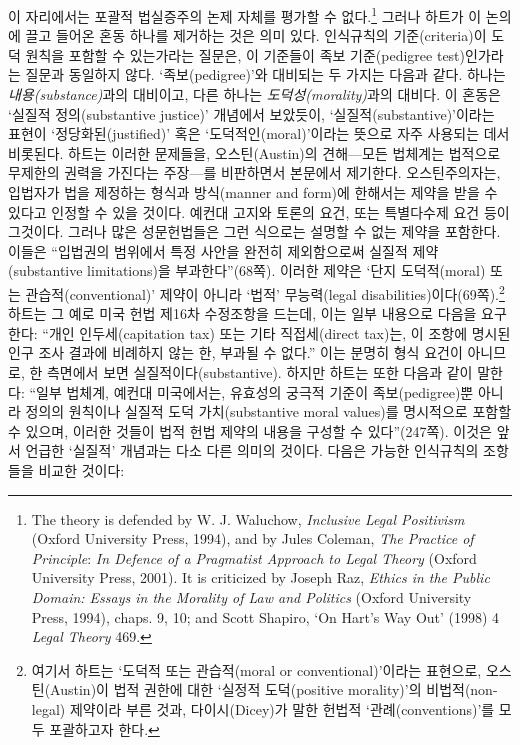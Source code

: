 \documentclass[12pt, oneside]{book}  %
\begin{document}
이 자리에서는 포괄적 법실증주의 논제 자체를 평가할 수 없다.\footnote{The
  theory is defended by W. J. Waluchow, \emph{Inclusive Legal
  Positivism} (Oxford University Press, 1994), and by Jules Coleman,
  \emph{The Practice of Principle}: \emph{In Defence of a Pragmatist
  Approach to Legal Theory} (Oxford University Press, 2001). It is
  criticized by Joseph Raz, \emph{Ethics in the Public Domain: Essays in
  the Morality of Law and Politics} (Oxford University Press, 1994),
  chaps. 9, 10; and Scott Shapiro, `On Hart's Way Out' (1998) 4
  \emph{Legal Theory} 469.} 그러나 하트가 이 논의에 끌고 들어온 혼동
하나를 제거하는 것은 의미 있다. 인식규칙의 기준(criteria)이 도덕 원칙을
포함할 수 있는가라는 질문은, 이 기준들이 족보 기준(pedigree
test)인가라는 질문과 동일하지 않다. `족보(pedigree)'와 대비되는 두
가지는 다음과 같다. 하나는 \emph{내용(substance)}과의 대비이고, 다른
하나는 \emph{도덕성(morality)}과의 대비다. 이 혼동은 `실질적
정의(substantive justice)' 개념에서 보았듯이,
`실질적(substantive)'이라는 표현이 `정당화된(justified)' 혹은
`도덕적인(moral)'이라는 뜻으로 자주 사용되는 데서 비롯된다. 하트는
이러한 문제들을, 오스틴(Austin)의 견해---모든 법체계는 법적으로 무제한의
권력을 가진다는 주장---를 비판하면서 본문에서 제기한다. 오스틴주의자는,
입법자가 법을 제정하는 형식과 방식(manner and form)에 한해서는 제약을
받을 수 있다고 인정할 수 있을 것이다. 예컨대 고지와 토론의 요건, 또는
특별다수제 요건 등이 그것이다. 그러나 많은 성문헌법들은 그런 식으로는
설명할 수 없는 제약을 포함한다. 이들은 ``입법권의 범위에서 특정 사안을
완전히 제외함으로써 실질적 제약(substantive limitations)을
부과한다''(68쪽). 이러한 제약은 `단지 도덕적(moral) 또는
관습적(conventional)' 제약이 아니라 `법적' 무능력(legal
disabilities)이다(69쪽).\footnote{여기서 하트는 `도덕적 또는
  관습적(moral or conventional)'이라는 표현으로, 오스틴(Austin)이 법적
  권한에 대한 `실정적 도덕(positive morality)'의 비법적(non-legal)
  제약이라 부른 것과, 다이시(Dicey)가 말한 헌법적 `관례(conventions)'를
  모두 포괄하고자 한다.} 하트는 그 예로 미국 헌법 제16차 수정조항을
드는데, 이는 일부 내용으로 다음을 요구한다: ``개인 인두세(capitation
tax) 또는 기타 직접세(direct tax)는, 이 조항에 명시된 인구 조사 결과에
비례하지 않는 한, 부과될 수 없다.'' 이는 분명히 형식 요건이 아니므로, 한
측면에서 보면 실질적이다(substantive). 하지만 하트는 또한 다음과 같이
말한다: ``일부 법체계, 예컨대 미국에서는, 유효성의 궁극적 기준이
족보(pedigree)뿐 아니라 정의의 원칙이나 실질적 도덕 가치(substantive
moral values)를 명시적으로 포함할 수 있으며, 이러한 것들이 법적 헌법
제약의 내용을 구성할 수 있다''(247쪽). 이것은 앞서 언급한 `실질적'
개념과는 다소 다른 의미의 것이다. 다음은 가능한 인식규칙의 조항들을
비교한 것이다:
\end{document}
